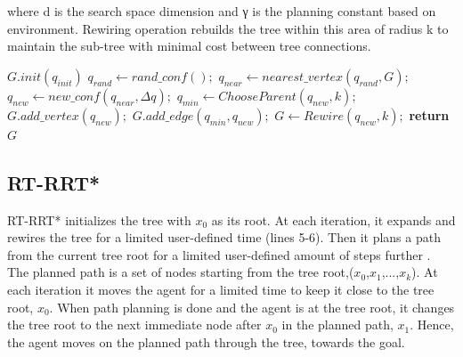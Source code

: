 \documentclass[runningheads]{llncs}
\begin{document}
\hspace{-6mm}where d is the search space dimension and γ is the planning constant    based    on    environment. Rewiring operation rebuilds the tree within this area of radius k to maintain the sub-tree with minimal cost between tree connections. 


\begin{algorithm}
\caption{RRT* algorithm}\label{RRT*}
\begin{algorithmic}[1]
\State $G.init(q_{init})$
\State $q_{rand}\gets rand\_conf();$
\State $q_{near}\gets nearest\_vertex(q_{rand}, G);$
\State $q_{new}\gets new\_conf(q_{near}, \Delta q);$
\State $q_{min}\gets ChooseParent(q_{new},k);$
\State $G.add\_vertex(q_{new});$
\State $G.add\_edge(q_{min},q_{new});$
\State $G\gets Rewire(q_{new},k);$
\EndIf
\EndFor
\State \textbf{return} $G$
\EndProcedure
\end{algorithmic}
\end{algorithm}
  
\subsection{RT-RRT*}
RT-RRT*\cite{RT-RRT*} initializes the tree
with $x_0$ as its root. At each iteration, it expands and rewires the tree for a limited user-defined time (lines 5-6).  Then it plans a path from the current tree root for a limited user-defined amount of steps further . The planned path is a set of nodes starting from the tree root,($x_0$,$x_1$,...,$x_k$).  At each iteration it moves the agent for a limited time to keep it close to the tree root, $x_0$.  When path planning is done and the agent is at the tree root, it changes the tree root to the next immediate node after $x_0$ in the planned path, $x_1$.  Hence, the agent moves on the planned path through the tree, towards the goal.
\end{document}
